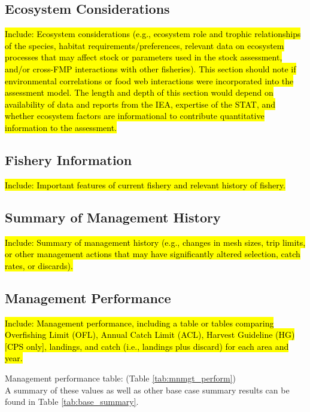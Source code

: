 \documentclass[12pt,]{article}
\begin{document}
\subsection{Ecosystem Considerations}\label{ecosystem-considerations-1}

\hl{Include: Ecosystem considerations (e.g., ecosystem role and trophic relationships of 
the species, habitat requirements/preferences, relevant data on ecosystem processes 
that may affect stock or parameters used in the stock assessment, and/or cross-FMP 
interactions with other fisheries). This section should note if environmental 
correlations or food web interactions were incorporated into the assessment model. 
The length and depth of this section would depend on availability of data and reports 
from the IEA, expertise of the STAT, and whether ecosystem factors are informational 
to contribute quantitative information to the assessment.}

\subsection{Fishery Information}\label{fishery-information}

\hl{Include: Important features of current fishery and relevant history of fishery.}

\subsection{Summary of Management
History}\label{summary-of-management-history}

\hl{Include: Summary of management history (e.g., changes in mesh sizes, trip 
limits, or other management actions that may have significantly altered selection, 
catch rates, or discards).}

\subsection{Management Performance}\label{management-performance-1}

\hl{Include: Management performance, including a table or tables comparing 
Overfishing Limit (OFL), Annual Catch Limit (ACL), Harvest Guideline (HG) 
[CPS only], landings, and catch (i.e., landings plus discard) for each area and year.}

Management performance table: (Table \ref{tab:mnmgt_perform})\\
A summary of these values as well as other base case summary results can
be found in Table \ref{tab:base_summary}.
\end{document}

